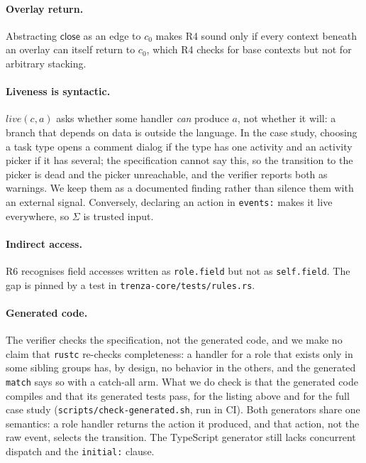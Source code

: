 \paragraph{Overlay return.} Abstracting $\mathsf{close}$ as an edge to
$c_0$ makes R4 sound only if every context beneath an overlay can itself
return to $c_0$, which R4 checks for base contexts but not for arbitrary
stacking. 

\paragraph{Liveness is syntactic.} $\mathit{live}(c,a)$ asks whether some
handler \emph{can} produce $a$, not whether it will: a branch that depends
on data is outside the language. In the case study, choosing a task type
opens a comment dialog if the type has one activity and an activity picker
if it has several; the specification cannot say this, so the transition to
the picker is dead and the picker unreachable, and the verifier reports
both as warnings. We keep them as a documented finding rather than silence
them with an external signal. Conversely, declaring an action in
\texttt{events:} makes it live everywhere, so $\Sigma$ is trusted input.

\paragraph{Indirect access.} R6 recognises field accesses written as
\texttt{role.field} but not as \texttt{self.field}. The gap is pinned by a
test in \nolinkurl{trenza-core/tests/rules.rs}. 

\paragraph{Generated code.} The verifier checks the specification, not the
generated code, and we make no claim that \texttt{rustc} re-checks
completeness: a handler for a role that exists only in some sibling groups
has, by design, no behavior in the others, and the generated \texttt{match}
says so with a catch-all arm. What we do check is that the generated code
compiles and that its generated tests pass, for the listing above and for
the full case study (\nolinkurl{scripts/check-generated.sh}, run in CI).
Both generators share one semantics: a role handler returns the action it
produced, and that action, not the raw event, selects the transition.
The TypeScript generator still lacks concurrent dispatch and the
\texttt{initial:} clause. 
